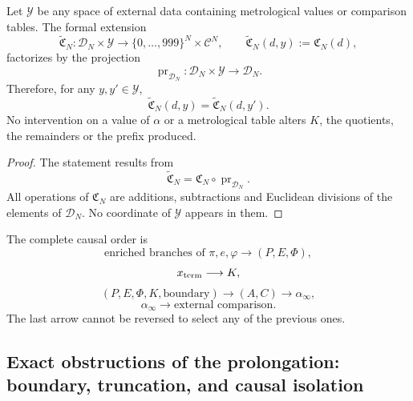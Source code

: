 \begin{theorem}
\label{p3-83-c25-s5:thm:no-interferencia-metrologica-alpha}
Let \(\mathscr Y\) be any space of external data containing metrological
values or comparison tables. The formal extension
\[
 \widetilde{\mathfrak C}_N:
 \mathscr D_N\times\mathscr Y
 \longrightarrow
 \{0,\ldots,999\}^{N}\times\mathcal C^{N},
 \qquad
 \widetilde{\mathfrak C}_N(d,y):=\mathfrak C_N(d),
\]
factorizes by the projection
\[
 \operatorname{pr}_{\mathscr D_N}:
 \mathscr D_N\times\mathscr Y\longrightarrow\mathscr D_N.
\]
Therefore, for any \(y,y'\in\mathscr Y\),
\[
 \widetilde{\mathfrak C}_N(d,y)
 =\widetilde{\mathfrak C}_N(d,y').
\]
No intervention on a value of \(\alpha\) or a metrological
table alters \(K\), the quotients, the remainders or the prefix produced.
\end{theorem}

\begin{proof}
The statement results from
\[
 \widetilde{\mathfrak C}_N
 =\mathfrak C_N\circ\operatorname{pr}_{\mathscr D_N}.
\]
All operations of \(\mathfrak C_N\) are additions, subtractions and Euclidean
divisions of the elements of \(\mathscr D_N\). No coordinate of
\(\mathscr Y\) appears in them.
\end{proof}

The complete causal order is
\[
 \text{enriched branches of }\pi,e,\varphi
 \longrightarrow(P,E,\Phi),
\]
\[
 x_{\rm term}\longrightarrow K,
\]
\[
 (P,E,\Phi,K,\text{boundary})
 \longrightarrow(A,C)
 \longrightarrow\alpha_\infty,
\]
\[
 \alpha_\infty
 \longrightarrow\text{external comparison}.
\]
The last arrow cannot be reversed to select any of the previous ones.

\subsection{Exact obstructions of the prolongation: boundary, truncation, and causal isolation}

